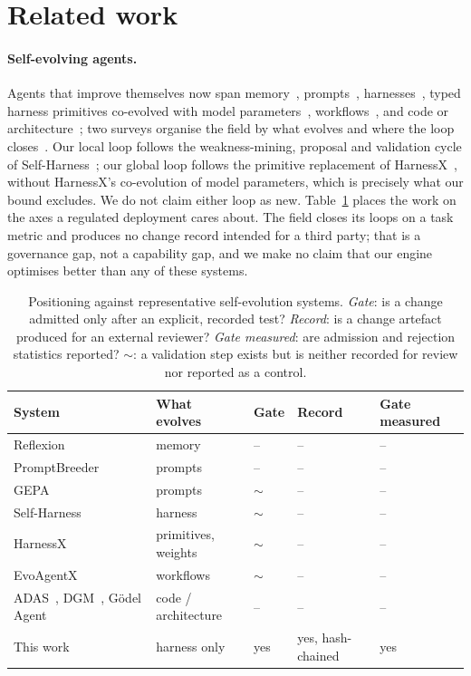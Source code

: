 \documentclass[11pt]{article}
\begin{document}
\section{Related work}
\label{sec:related}

\paragraph{Self-evolving agents.} Agents that improve themselves now span memory~\cite{reflexion}, prompts~\cite{promptbreeder,gepa}, harnesses~\cite{selfharness}, typed harness primitives co-evolved with model parameters~\cite{harnessx}, workflows~\cite{evoagentx}, and code or architecture~\cite{adas,godel,dgm}; two surveys organise the field by what evolves and where the loop closes~\cite{fang2025survey,gao2025survey}. Our local loop follows the weakness-mining, proposal and validation cycle of Self-Harness~\cite{selfharness}; our global loop follows the primitive replacement of HarnessX~\cite{harnessx}, without HarnessX's co-evolution of model parameters, which is precisely what our bound excludes. We do not claim either loop as new. Table~\ref{tab:positioning} places the work on the axes a regulated deployment cares about. The field closes its loops on a task metric and produces no change record intended for a third party; that is a governance gap, not a capability gap, and we make no claim that our engine optimises better than any of these systems.

\begin{table}[t]
\centering\small
\caption{Positioning against representative self-evolution systems. \emph{Gate}: is a change admitted only after an explicit, recorded test? \emph{Record}: is a change artefact produced for an external reviewer? \emph{Gate measured}: are admission and rejection statistics reported? $\sim$: a validation step exists but is neither recorded for review nor reported as a control.}
\label{tab:positioning}
\begin{tabular}{lllll}
\toprule
System & What evolves & Gate & Record & Gate measured\\
\midrule
Reflexion~\cite{reflexion} & memory & -- & -- & -- \\
PromptBreeder~\cite{promptbreeder} & prompts & -- & -- & -- \\
GEPA~\cite{gepa} & prompts & $\sim$ & -- & -- \\
Self-Harness~\cite{selfharness} & harness & $\sim$ & -- & -- \\
HarnessX~\cite{harnessx} & primitives, weights & $\sim$ & -- & -- \\
EvoAgentX~\cite{evoagentx} & workflows & $\sim$ & -- & -- \\
ADAS~\cite{adas}, DGM~\cite{dgm}, G\"odel Agent~\cite{godel} & code / architecture & -- & -- & -- \\
This work & harness only & yes & yes, hash-chained & yes \\
\bottomrule
\end{tabular}
\end{table}
\end{document}
